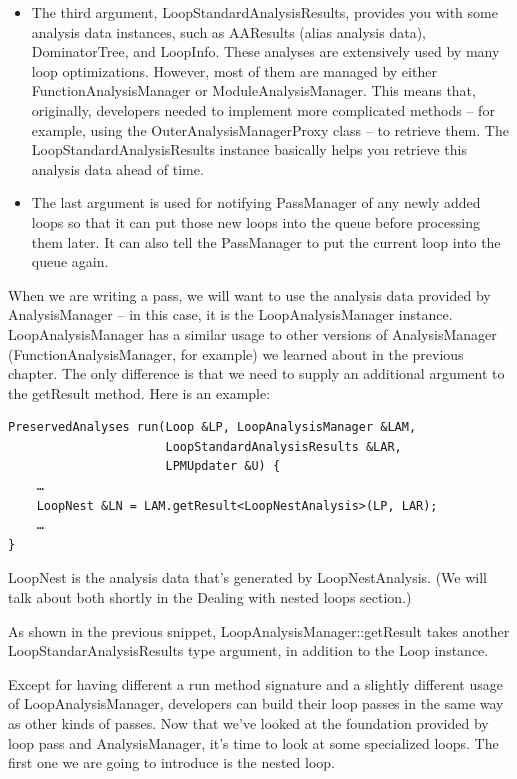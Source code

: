 \begin{itemize}
\item The third argument, LoopStandardAnalysisResults, provides you with some analysis data instances, such as AAResults (alias analysis data), DominatorTree, and LoopInfo. These analyses are extensively used by many loop optimizations. However, most of them are managed by either FunctionAnalysisManager or ModuleAnalysisManager. This means that, originally, developers needed to implement more complicated methods – for example, using the OuterAnalysisManagerProxy class – to retrieve them. The LoopStandardAnalysisResults instance basically helps you retrieve this analysis data ahead of time.

\item The last argument is used for notifying PassManager of any newly added loops so that it can put those new loops into the queue before processing them later. It can also tell the PassManager to put the current loop into the queue again.

\end{itemize}

When we are writing a pass, we will want to use the analysis data provided by AnalysisManager – in this case, it is the LoopAnalysisManager instance. LoopAnalysisManager has a similar usage to other versions of AnalysisManager (FunctionAnalysisManager, for example) we learned about in the previous chapter. The only difference is that we need to supply an additional argument to the getResult method. Here is an example:

\begin{lstlisting}[style=styleCXX]
PreservedAnalyses run(Loop &LP, LoopAnalysisManager &LAM,
					  LoopStandardAnalysisResults &LAR,
					  LPMUpdater &U) {
	…
	LoopNest &LN = LAM.getResult<LoopNestAnalysis>(LP, LAR);
	…
}
\end{lstlisting}

LoopNest is the analysis data that's generated by LoopNestAnalysis. (We will talk about both shortly in the Dealing with nested loops section.)

As shown in the previous snippet, LoopAnalysisManager::getResult takes another LoopStandarAnalysisResults type argument, in addition to the Loop
instance.

Except for having different a run method signature and a slightly different usage of LoopAnalysisManager, developers can build their loop passes in the same way as other kinds of passes. Now that we've looked at the foundation provided by loop pass and AnalysisManager, it's time to look at some specialized loops. The first one we are going to introduce is the nested loop.

